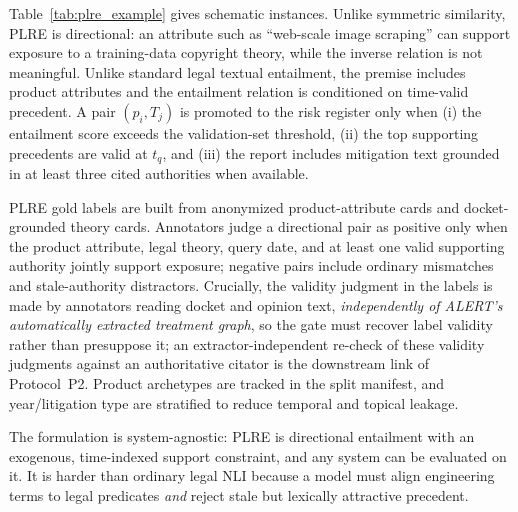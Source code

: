 Table~\ref{tab:plre_example} gives schematic instances. Unlike symmetric similarity, PLRE is directional: an attribute such as ``web-scale image scraping'' can support exposure to a training-data copyright theory, while the inverse relation is not meaningful. Unlike standard legal textual entailment, the premise includes product attributes and the entailment relation is conditioned on time-valid precedent. A pair $(p_i,T_j)$ is promoted to the risk register only when (i) the entailment score exceeds the validation-set threshold, (ii) the top supporting precedents are valid at $t_q$, and (iii) the report includes mitigation text grounded in at least three cited authorities when available.

PLRE gold labels are built from anonymized product-attribute cards and docket-grounded theory cards. Annotators judge a directional pair as positive only when the product attribute, legal theory, query date, and at least one valid supporting authority jointly support exposure; negative pairs include ordinary mismatches and stale-authority distractors. Crucially, the validity judgment in the labels is made by annotators reading docket and opinion text, \emph{independently of ALERT's automatically extracted treatment graph}, so the gate must recover label validity rather than presuppose it; an extractor-independent re-check of these validity judgments against an authoritative citator is the downstream link of Protocol~P2. Product archetypes are tracked in the split manifest, and year/litigation type are stratified to reduce temporal and topical leakage.

The formulation is system-agnostic: PLRE is directional entailment with an exogenous, time-indexed support constraint, and any system can be evaluated on it. It is harder than ordinary legal NLI because a model must align engineering terms to legal predicates \emph{and} reject stale but lexically attractive precedent.

